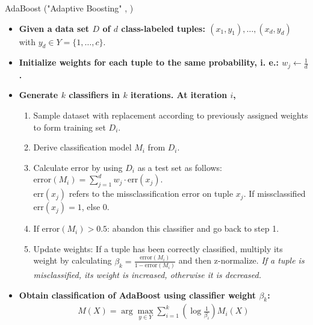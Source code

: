\begin{frame}{AdaBoost ("Adaptive Boosting" , )}
	\vspace*{-.5em}
	\begin{itemize}
		\item \textbf{Given a data set $D$ of $d$ class-labeled tuples: $(x_1 , y_1), \ldots, (x_d, y_d)$} with $y_d \in Y = \{1, \dots, c\}$.
		\item \textbf{Initialize weights for each tuple to the same probability, i. e.: $w_j \leftarrow \frac{1}{d}$.}
		\item \textbf{Generate $k$ classifiers in $k$ iterations. At iteration $i$,}
		      \begin{enumerate}
			      \item Sample dataset with replacement according to previously assigned weights to form training set $D_i$.
			      \item Derive classification model $M_i$ from $D_i$.
			      \item Calculate error by using $D_i$ as a test set as follows: $\text{error}(M_i) = \sum_{j=1}^{d} w_j \cdot \text{err}(x_j)$.\\
			            $\text{err}(x_j)$ refers to the missclassification error on tuple $x_j$. If missclassified $\text{err}(x_j)=1$, else $0$.
			      \item If $\text{error}(M_i)>0.5$: abandon this classifier and go back to step 1.
			      \item Update weights: If a tuple has been correctly classified, multiply its weight by calculating $\beta_k = \frac{\text{error}(M_i)}{1-\text{error}(M_i)}$ and then z-normalize. \textit{If a tuple is misclassified, its weight is increased, otherwise it is decreased.}
		      \end{enumerate}
		\item \textbf{Obtain classification of AdaBoost using classifier weight $\beta_k$:}
		      \begin{align*}
			      \textstyle M(X)= \arg \max_{y\in Y} \sum_{i=1}^k (\log \frac{1}{\beta_i})M_i(X)
		      \end{align*}

	\end{itemize}
\end{frame}

